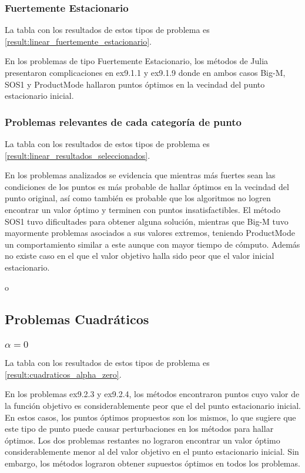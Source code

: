   
\subsubsection{Fuertemente Estacionario}
La tabla con los resultados de estos tipos de problema es \ref{result:linear_fuertemente_estacionario}.
    
 En los problemas de tipo Fuertemente Estacionario, los métodos de Julia presentaron complicaciones  en  ex9.1.1 y ex9.1.9 donde en ambos casos Big-M, SOS1 y ProductMode hallaron puntos óptimos en la vecindad del punto estacionario inicial.



\subsubsection{Problemas relevantes de cada categoría de punto}

La tabla con los resultados de estos tipos de problema es \ref{result:linear_resultados_seleccionados}.

En los problemas analizados se evidencia que mientras más fuertes sean las condiciones de los puntos es más probable de hallar óptimos en la vecindad del punto original, 
así como también es probable que los algoritmos no logren encontrar un valor óptimo y terminen con puntos insatisfactibles.
El método SOS1 tuvo dificultades para obtener alguna solución, mientras que Big-M tuvo mayormente problemas asociados a sus valores extremos, teniendo ProductMode un comportamiento similar a este aunque con mayor tiempo de cómputo.
Además no existe caso en el que el valor objetivo halla sido peor que el valor inicial estacionario.
   

o

\subsection{Problemas Cuadráticos}


\subsubsection{$\alpha =0$}
La tabla con los resultados de estos tipos de problema es \ref{result:cuadraticos_alpha_zero}.

En los problemas ex9.2.3 y ex9.2.4, los métodos encontraron puntos cuyo valor de la función objetivo es considerablemente peor que el del punto estacionario inicial. 
En estos casos, los puntos óptimos propuestos son los mismos, lo que sugiere que este tipo de punto puede causar perturbaciones en los métodos para hallar óptimos. 
Los dos problemas restantes no lograron encontrar un valor óptimo considerablemente menor al del valor objetivo en el punto estacionario inicial. 
Sin embargo, los métodos lograron obtener supuestos óptimos en todos los problemas.
    
